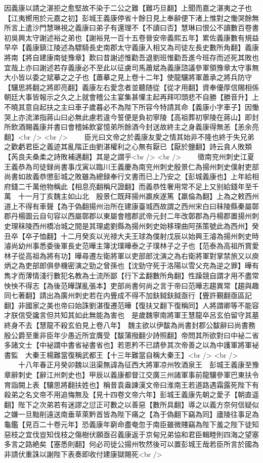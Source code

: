因義康以請之湛拒之愈堅故不染于二公之難【難巧旦翻】上聞而嘉之湛夷之子也【江夷嚮用於元嘉之初】彭城王義康停省十餘日見上奉辭便下渚上惟對之慟哭餘無所言上遣沙門慧琳視之義康曰弟子有還理不【不讀曰否】慧琳曰恨公不讀數百卷書初吳興太守謝述裕之弟也【謝裕見一百十五卷晉安帝義熙五年】累佐義康數有規益早卒【義康鎮江陵述為驃騎長史南郡太守義康入相又為司徒左長史數所角翻】義康將南【將自建康南徙豫章】歎曰昔謝述惟勸吾退劉班惟勸吾進今班存而述死其敗也宜哉上亦曰謝述若存義康必不至此以征虜司馬蕭斌為義康諮議參軍領豫章太守事無大小皆以委之斌摹之之子也【蕭摹之見上卷十二年】使龍驤將軍蕭承之將兵防守【驤思將翻之將即亮翻】義康左右愛念者並聽随從【從才用翻】資奉優厚信賜相係朝廷大事皆報示之久之上就會稽公主宴集甚懽主起再拜叩頭悲不自勝【勝音升】上不曉其意自起扶之主曰車子歲暮必不為陛下所容今特請其命【義康小字車子】因慟哭上亦流涕指蔣山曰必無此慮若違今誓便是負初寧陵【高祖葬初寧陵在蔣山】即封所飲酒賜義康并書曰會稽姊飲宴憶弟所餘酒今封送故終主之身義康得無恙【恙余亮翻】<br />
<br />
　　臣光曰文帝之於義康友愛之情其始非不隆也終于失兄弟之歡虧君臣之義迹其亂階正由劉湛權利之心無有厭已【厭於鹽翻】詩云貪人敗類【芮良夫桑柔之詩敗補邁翻】其是之謂乎<br />
<br />
　　徵南兖州刺史江夏王義恭為司徒録尚書事戊寅以臨川王義慶為南兖州刺史殷景仁為揚州刺史僕射吏部尚書如故義恭懲彭城之敗雖為總録奉行文書而已上乃安之【彭城義康也】上年給相府錢二千萬他物稱此【相息亮翻稱尺證翻】而義恭性奢用常不足上又别給錢年至千萬　十一月丁亥魏主如山北　殷景仁既拜揚州羸疾遂篤【羸倫為翻】上為之敕西州道上不得有車聲【為于偽翻揚州治所在建康臺城西故謂之西州宋白曰秣陵縣秦屬鄣郡丹楊圖云自句容以西屬鄣郡以東屬會稽郡武帝元封二年改鄣郡為丹楊郡置揚州刺史理秣陵西州橋冶城之間是其理處劉縣為揚州刺史始移理曲阿孫策號此為西州】癸丑卒【卒子恤翻】十二月癸亥以光禄大夫王球為僕射戊辰以始興王濬為揚州刺史時濬尚幼州事悉委後軍長史范曄主簿沈璞曄泰之子璞林子之子也【范泰為高祖所賞愛林子從高祖為將有功】曄尋遷左衛將軍以吏部郎沈演之為右衛將軍對掌禁旅又以庾炳之為吏部郎俱參機密演之勁之曾孫也【沈勁守死于洛陽以雪父充為逆之罪】曄有雋才而薄情淺行數犯名教為士流所鄙【行下孟翻數所角翻】性躁競自謂才用不盡常怏怏不得志【為後范曄謀亂張本】吏部尚書何尚之言于帝曰范曄志趨異常【趨與趣同七著翻】請出為廣州刺史若在内舋成不得不加鈇鉞鈇鉞亟行【舋許覲翻亟區記翻】非國家之美也帝曰始誅劉湛復遷范曄【復扶又翻下復稱同】人將謂卿等不能容才朕信受讒言但共知其如此無能為害也　是歲魏寧南將軍王慧龍卒呂玄伯留守其墓終身不去【慧龍不殺玄伯見上卷八年】　魏主欲以伊馛為尚書封郡公馛辭曰尚書務殷公爵至重非臣年少愚近所宜膺受【馛蒲撥翻少詩照翻】帝問其所欲對曰中袐二省多諸文士【中袐謂中書省袐書省也】若恩矜不已請參其次帝善之以為中護軍將軍袐書監　大秦王楊難當復稱武都王【十三年難當自稱大秦王】<br />
<br />
　　十八年春正月癸卯魏以沮渠無諱為征西大將軍凉州牧酒泉王　彭城王義康至豫章辭刺史【辭江州刺史也】甲辰以義康都督江交廣三州諸軍事前龍驤參軍巴東扶令育詣闕上表【驤思將翻扶姓也】稱昔袁盎諫漢文帝曰淮南王若道路遇霜露死陛下有殺弟之名文帝不用追悔無及【見十四卷文帝六年】彭城王義康先朝之愛子【朝直遥翻】陛下之次弟若有迷謬之愆正可數之以善惡【數所具翻】導之以義方奈何信疑似之嫌一旦黜削遠送南垂草萊黔首皆為陛下痛之【為于偽翻下竊為同】廬陵往事足為龜鑑【見百二十卷元年】恐義康年窮命盡奄忽于南臣雖微賤竊為陛下羞之陛下徒知惡枝之宜伐豈知伐枝之傷樹伏願亟召義康返于京甸兄弟協和君臣輯睦則四海之望塞多言之路絶矣【塞悉則翻】何必司徒公揚州牧然後可以置彭城王哉若臣所言於國為非請伏重誅以謝陛下表奏即收付建康獄賜死<br />
